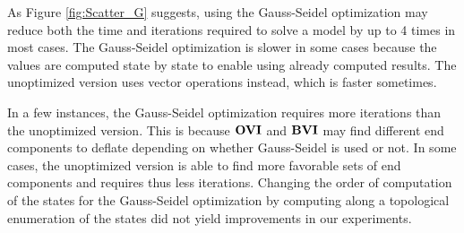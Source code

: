 As Figure \ref{fig:Scatter_G} suggests, using the Gauss-Seidel optimization may reduce both the time and iterations required to solve a model by up to 4 times in most cases.
The Gauss-Seidel optimization is slower in some cases because the values are computed state by state to enable using already computed results.
The unoptimized version uses vector operations instead, which is faster sometimes.

In a few instances, the Gauss-Seidel optimization requires more iterations than the unoptimized version. 
This is because $\mathbf{OVI}$ and $\mathbf{BVI}$ may find different end components to deflate depending on whether Gauss-Seidel is used or not.
In some cases, the unoptimized version is able to find more favorable sets of end components and requires thus less iterations.
Changing the order of computation of the states for the Gauss-Seidel optimization by computing along a topological enumeration of the states did not
yield improvements in our experiments. 
\FloatBarrier 

